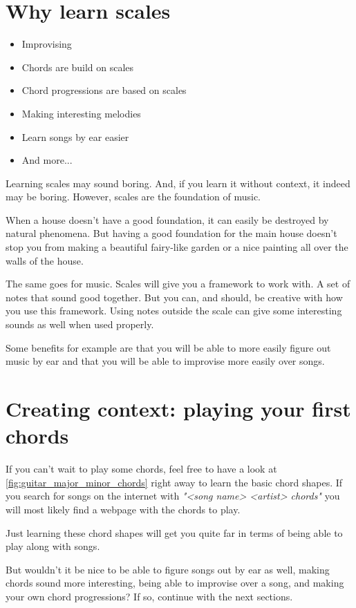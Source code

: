 \section{Why learn scales}

\begin{itemize}
	\item Improvising
	\item Chords are build on scales
	\item Chord progressions are based on scales
	\item Making interesting melodies
	\item Learn songs by ear easier
	\item And more...
\end{itemize}

Learning scales may sound boring. And, if you learn it without context, it indeed may be boring. However, scales are the foundation of music.

When a house doesn't have a good foundation, it can easily be destroyed by natural phenomena. But having a good foundation for the main house doesn't stop you from making a beautiful fairy-like garden or a nice painting all over the walls of the house.

The same goes for music. Scales will give you a framework to work with. A set of notes that sound good together. But you can, and should, be creative with how you use this framework. Using notes outside the scale can give some interesting sounds as well when used properly.

Some benefits for example are that you will be able to more easily figure out music by ear and that you will be able to improvise more easily over songs. 

\section{Creating context: playing your first chords}

If you can't wait to play some chords, feel free to have a look at \autoref{fig:guitar_major_minor_chords} right away to learn the basic chord shapes. If you search for songs on the internet with \textit{"<song name> <artist> chords"} you will most likely find a webpage with the chords to play.

Just learning these chord shapes will get you quite far in terms of being able to play along with songs.

But wouldn't it be nice to be able to figure songs out by ear as well, making chords sound more interesting, being able to improvise over a song, and making your own chord progressions? If so, continue with the next sections.

